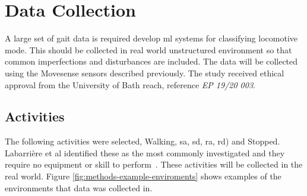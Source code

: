 \section{Data Collection}
\label{sec:methods-data-collection}
A large set of gait data is required develop \acrshort{ml} systems for classifying locomotive mode. This should be collected in real world unstructured environment so that common imperfections and disturbances are included. The data will be collected using the Movesense sensors described previously. The study received ethical approval from the University of Bath \acrfull{reach}, reference \textit{EP 19/20 003}.

\subsection{Activities}
The following activities were selected, Walking, \acrfull{sa}, \acrfull{sd}, \acrfull{ra}, \acrfull{rd}) and Stopped. Labarri\`ere et al identified these as the most commonly investigated and they require no equipment or skill to perform~\cite{Labarriere2020}. These activities will be collected in the real world. Figure \ref{fig:methods-example-enviroments} shows examples of the environments that data was collected in.


